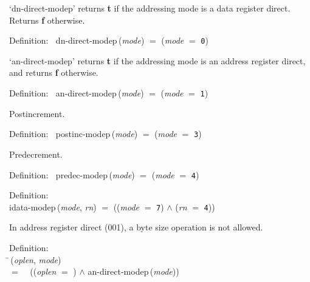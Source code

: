  `dn-direct-modep' returns {\bf{t}} if the addressing mode is a data register direct.
 Returns {\bf{f}} otherwise.
\begin{tabbing}{\sc Definition}:$\;\;$
{\rm{dn-direct-modep}}\,({\it{mode\/}}) $=$ ({\it{mode\/}} $=$ {\tt{0}})
\end{tabbing}

 `an-direct-modep' returns {\bf{t}} if the addressing mode is an address register direct,
 and returns {\bf{f}} otherwise.
\begin{tabbing}{\sc Definition}:$\;\;$
{\rm{an-direct-modep}}\,({\it{mode\/}}) $=$ ({\it{mode\/}} $=$ {\tt{1}})
\end{tabbing}

 Postincrement.
\begin{tabbing}{\sc Definition}:$\;\;$
{\rm{postinc-modep}}\,({\it{mode\/}}) $=$ ({\it{mode\/}} $=$ {\tt{3}})
\end{tabbing}

 Predecrement.
\begin{tabbing}{\sc Definition}:$\;\;$
{\rm{predec-modep}}\,({\it{mode\/}}) $=$ ({\it{mode\/}} $=$ {\tt{4}})
\end{tabbing}

\begin{tabbing}{\sc Definition}: \\  
{\rm{idata-modep}}\,({\it{mode\/}}, {\it{rn\/}}) $=$ (({\it{mode\/}} $=$ {\tt{7}}) $\wedge$ ({\it{rn\/}} $=$ {\tt{4}}))
\end{tabbing}

 In address register direct (001), a byte size operation is not allowed.
\begin{tabbing}{\sc Definition}: \\  
\=\,({\it{oplen\/}}, {\it{mode\/}}) \\ 
$=$$\;\;\;\;$(({\it{oplen\/}} $=$ {}) $\wedge$ {\rm{an-direct-modep}}\,({\it{mode\/}}))\-
\end{tabbing}

